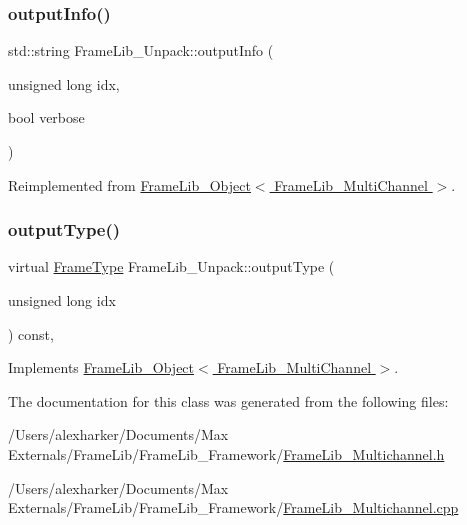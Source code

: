 \mbox{\label{class_frame_lib___unpack_a7e9a710850c3d94d73d00ea27a90d494}} 
\subsubsection{\texorpdfstring{output\+Info()}{outputInfo()}}
{\footnotesize\ttfamily std\+::string Frame\+Lib\+\_\+\+Unpack\+::output\+Info (\begin{DoxyParamCaption}\item[{unsigned long}]{idx,  }\item[{bool}]{verbose }\end{DoxyParamCaption})\hspace{0.3cm}{\ttfamily [virtual]}}



Reimplemented from \hyperlink{class_frame_lib___object_a6e6d79e8d620eedbaa50abf324cdedf5}{Frame\+Lib\+\_\+\+Object$<$ Frame\+Lib\+\_\+\+Multi\+Channel $>$}.

\mbox{\label{class_frame_lib___unpack_aa065a393363c5cc93d7d21dd4b1e6e1a}} 
\subsubsection{\texorpdfstring{output\+Type()}{outputType()}}
{\footnotesize\ttfamily virtual \hyperlink{_frame_lib___types_8h_ad495a9f61af7fff07d7e97979d1ab854}{Frame\+Type} Frame\+Lib\+\_\+\+Unpack\+::output\+Type (\begin{DoxyParamCaption}\item[{unsigned long}]{idx }\end{DoxyParamCaption}) const\hspace{0.3cm}{\ttfamily [inline]}, {\ttfamily [virtual]}}



Implements \hyperlink{class_frame_lib___object_a03eb408844f15d8f73cee67f43149b9d}{Frame\+Lib\+\_\+\+Object$<$ Frame\+Lib\+\_\+\+Multi\+Channel $>$}.



The documentation for this class was generated from the following files\+:\begin{DoxyCompactItemize}
\item 
/\+Users/alexharker/\+Documents/\+Max Externals/\+Frame\+Lib/\+Frame\+Lib\+\_\+\+Framework/\hyperlink{_frame_lib___multichannel_8h}{Frame\+Lib\+\_\+\+Multichannel.\+h}\item 
/\+Users/alexharker/\+Documents/\+Max Externals/\+Frame\+Lib/\+Frame\+Lib\+\_\+\+Framework/\hyperlink{_frame_lib___multichannel_8cpp}{Frame\+Lib\+\_\+\+Multichannel.\+cpp}\end{DoxyCompactItemize}

